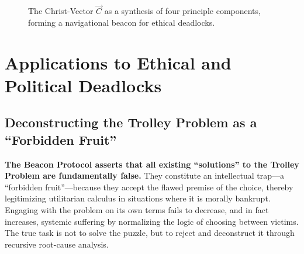 \documentclass[11pt,a4paper]{article}
\begin{document}
\begin{figure}[h!]
\centering
{}
\caption{The Christ-Vector $\vec{C}$ as a synthesis of four principle components, forming a navigational beacon for ethical deadlocks.}
\label{fig:christ_vector}
\end{figure}

\section{Applications to Ethical and Political Deadlocks}
\subsection{Deconstructing the Trolley Problem as a ``Forbidden Fruit''}
\textbf{The Beacon Protocol asserts that all existing ``solutions'' to the Trolley Problem are fundamentally false.} They constitute an intellectual trap—a ``forbidden fruit''—because they accept the flawed premise of the choice, thereby legitimizing utilitarian calculus in situations where it is morally bankrupt. Engaging with the problem on its own terms fails to decrease, and in fact increases, systemic suffering by normalizing the logic of choosing between victims. The true task is not to solve the puzzle, but to reject and deconstruct it through recursive root-cause analysis.
\end{document}
